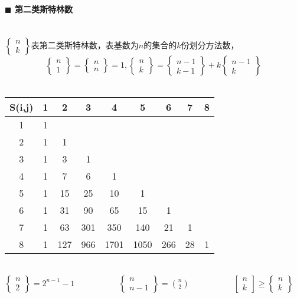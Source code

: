 \paragraph{$\blacksquare$ 第二类斯特林数}
\noindent \\
$\left\{\begin{matrix} n \\ k \end{matrix}\right\}$表第二类斯特林数，表基数为$n$的集合的$k$份划分方法数，$$\left\{\begin{matrix} n \\ 1 \end{matrix}\right\}=\left\{\begin{matrix} n \\ n \end{matrix}\right\}=1, \left\{\begin{matrix} n \\ k \end{matrix}\right\}=\left\{\begin{matrix} n-1 \\ k-1 \end{matrix}\right\}+k\left\{\begin{matrix} n-1 \\ k \end{matrix}\right\}$$\\
\begin{tabular}{|c|c|c|c|c|c|c|c|c|}
\hline S(i,j)&1&2&3&4&5&6&7&8\\
\hline 1&1&&&&&&& \\
\hline 2&1&1&&&&&&\\
\hline 3&1&3&1&&&&&\\
\hline 4&1&7&6&1&&&&\\
\hline 5&1&15&25&10&1&&&\\
\hline 6&1&31&90&65&15&1&&\\
\hline 7&1&63&301&350&140&21&1&\\
\hline 8&1&127&966&1701&1050&266&28&1\\
\hline
\end{tabular}\\
$\left\{\begin{matrix} n \\ 2 \end{matrix}\right\}=2^{n-1}-1$~~~~~~~~~~
$\left\{\begin{matrix} n \\ n-1 \end{matrix}\right\}=\binom{n}{2}$~~~~~~~~~~
$\left[\begin{matrix} n \\ k \end{matrix}\right] \geq \left\{\begin{matrix} n \\ k \end{matrix}\right\}$\\
